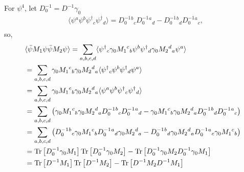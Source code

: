 For $\psi^4$, let $D_0^{-1}=D^{-1}\gamma _0$
\begin{equation}
\begin{split}
&\langle \psi {}^a \psi {}^b \psi^{\dagger}{}_c \psi^{\dagger}{}_d\rangle = D_0^{-1} {}^b{}_c D_0^{-1} {}^a{}_d - D_0^{-1} {}^b{}_d D_0^{-1} {}^a{}_c,\\
\end{split}
\end{equation}
so,
\begin{equation}
\begin{split}
&\langle \bar{\psi} M_1 \psi \bar{\psi} M_2 \psi\rangle = \sum _{a,b,c,d} \langle \psi^{\dagger} {}_c\gamma _0 M_1{}^c{}_b \psi {}^b \psi^{\dagger} {}_d \gamma _0 M_2{}^d{}_a \psi {}^a\rangle\\
&= \sum _{a,b,c,d}  \gamma _0 M_1{}^c{}_b \gamma _0 M_2{}^d{}_a \langle \psi^{\dagger} {}_c \psi {}^b \psi^{\dagger} {}_d  \psi {}^a\rangle\\
&= \sum _{a,b,c,d}  \gamma _0 M_1{}^c{}_b \gamma _0 M_2{}^d{}_a \langle \psi {}^a \psi {}^b \psi^{\dagger}{}_c \psi^{\dagger}{}_d\rangle\\
&= \sum _{a,b,c,d}  \left(\gamma _0 M_1{}^c{}_b \gamma _0 M_2{}^d{}_a D_0^{-1} {}^b{}_c D_0^{-1} {}^a{}_d - \gamma _0 M_1{}^c{}_b \gamma _0 M_2{}^d{}_a D_0^{-1} {}^b{}_d D_0^{-1} {}^a{}_c\right)\\
&= \sum _{a,b,c,d}  \left(  D_0^{-1} {}^b{}_c \gamma _0 M_1{}^c{}_b D_0^{-1} {}^a{}_d \gamma _0 M_2{}^d{}_a -   D_0^{-1} {}^b{}_d  \gamma _0 M_2{}^d{}_a D_0^{-1} {}^a{}_c \gamma _0 M_1{}^c{}_b\right)\\
&= {\rm Tr}\left[D_0^{-1} \gamma _0 M_1\right]{\rm Tr}\left[D_0^{-1} \gamma _0 M_2\right] - {\rm Tr}\left[D_0^{-1} \gamma _0 M_2 D_0^{-1} \gamma _0 M_1\right]\\
&= {\rm Tr}\left[D^{-1}  M_1\right]{\rm Tr}\left[D^{-1}M_2\right] - {\rm Tr}\left[D^{-1} M_2 D^{-1} M_1\right]\\
\end{split}
\end{equation}

